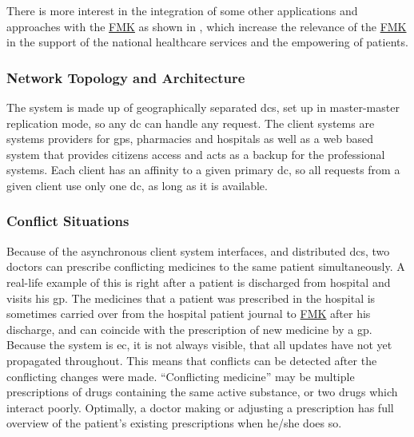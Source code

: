 There is more interest in the integration of some other applications and approaches with the \href{https://www.trifork.com/news/a-prestigious-prize-trifork-public}{FMK} as shown in \cite{Urazimbetov2012a, Hansen2011a}, which increase the relevance of the \href{https://www.trifork.com/news/a-prestigious-prize-trifork-public}{FMK} in the support of the national healthcare services and the empowering of patients.

\subsubsection{Network Topology and Architecture }
The system is made up of geographically separated \glspl{dc}, set up in master-master replication mode, so any \gls{dc} can handle any request. The client systems are systems providers for \glspl{gp}, pharmacies and hospitals as well as a web based system that provides citizens access and acts as a backup for the professional systems. Each client has an affinity to a given primary \gls{dc}, so all requests from a given client use only one \gls{dc}, as long as it is available.


\subsubsection{Conflict Situations}
Because of the asynchronous client system interfaces, and distributed \glspl{dc}, two doctors can prescribe conflicting medicines to the same patient simultaneously. A real-life example of this is right after a patient is discharged from hospital and visits his \gls{gp}. The medicines that a patient was prescribed in the hospital is sometimes carried over from the hospital patient journal to \href{https://www.trifork.com/news/a-prestigious-prize-trifork-public}{FMK} after his discharge, and can coincide with the prescription of new medicine by a \gls{gp}. Because the system is \gls{ec}, it is not always visible, that all updates have not yet propagated throughout. This means that conflicts can be detected after the conflicting changes were made. \textquotedblleft Conflicting medicine\textquotedblright{} may be multiple prescriptions of drugs containing the same active substance, or two drugs which interact poorly. Optimally, a doctor making or adjusting a prescription has full overview of the patient\textquoteright s existing prescriptions when he/she does so.


